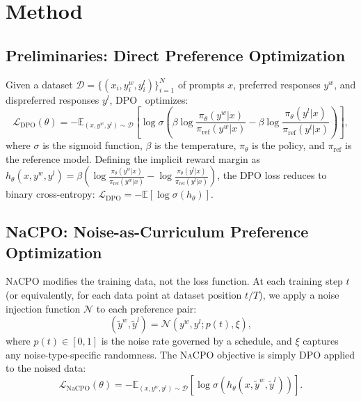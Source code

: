 \documentclass{article}
\newcommand{\nacpo}{\textsc{NaCPO}}
\newcommand{\E}{\mathbb{E}}
\begin{document}
\section{Method}
\label{sec:method}

\subsection{Preliminaries: Direct Preference Optimization}

Given a dataset $\mathcal{D} = \{(x_i, y_i^w, y_i^l)\}_{i=1}^N$ of prompts $x$, preferred responses $y^w$, and dispreferred responses $y^l$, DPO~\cite{PLACEHOLDER_rafailov2023direct} optimizes:
\begin{equation}
    \mathcal{L}_{\text{DPO}}(\theta) = -\E_{(x, y^w, y^l) \sim \mathcal{D}} \left[ \log \sigma\left( \beta \log \frac{\pi_\theta(y^w | x)}{\pi_{\text{ref}}(y^w | x)} - \beta \log \frac{\pi_\theta(y^l | x)}{\pi_{\text{ref}}(y^l | x)} \right) \right],
    \label{eq:dpo}
\end{equation}
where $\sigma$ is the sigmoid function, $\beta$ is the temperature, $\pi_\theta$ is the policy, and $\pi_{\text{ref}}$ is the reference model.
Defining the implicit reward margin as $h_\theta(x, y^w, y^l) = \beta \left( \log \frac{\pi_\theta(y^w|x)}{\pi_{\text{ref}}(y^w|x)} - \log \frac{\pi_\theta(y^l|x)}{\pi_{\text{ref}}(y^l|x)} \right)$, the DPO loss reduces to binary cross-entropy: $\mathcal{L}_{\text{DPO}} = -\E[\log \sigma(h_\theta)]$.

\subsection{NaCPO: Noise-as-Curriculum Preference Optimization}

\nacpo{} modifies the training data, not the loss function.
At each training step $t$ (or equivalently, for each data point at dataset position $t/T$), we apply a noise injection function $\mathcal{N}$ to each preference pair:
\begin{equation}
    (\tilde{y}^w, \tilde{y}^l) = \mathcal{N}(y^w, y^l; p(t), \xi),
    \label{eq:nacpo_inject}
\end{equation}
where $p(t) \in [0, 1]$ is the noise rate governed by a schedule, and $\xi$ captures any noise-type-specific randomness.
The \nacpo{} objective is simply DPO applied to the noised data:
\begin{equation}
    \mathcal{L}_{\text{NaCPO}}(\theta) = -\E_{(x, y^w, y^l) \sim \mathcal{D}} \left[ \log \sigma\left( h_\theta(x, \tilde{y}^w, \tilde{y}^l) \right) \right].
    \label{eq:nacpo}
\end{equation}
\end{document}
